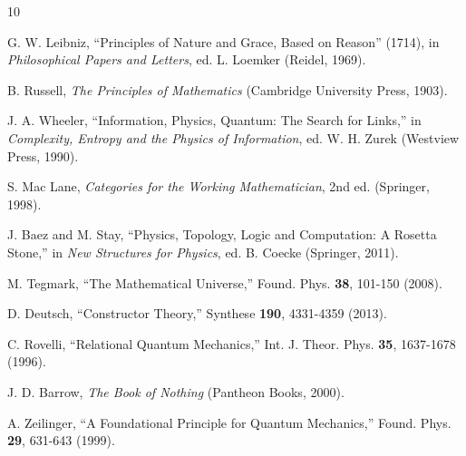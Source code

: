 \documentclass[12pt,a4paper]{article}
\begin{document}
\begin{thebibliography}{10}

G. W. Leibniz, ``Principles of Nature and Grace, Based on Reason'' (1714), in \textit{Philosophical Papers and Letters}, ed. L. Loemker (Reidel, 1969).

B. Russell, \textit{The Principles of Mathematics} (Cambridge University Press, 1903).

J. A. Wheeler, ``Information, Physics, Quantum: The Search for Links,'' in \textit{Complexity, Entropy and the Physics of Information}, ed. W. H. Zurek (Westview Press, 1990).

S. Mac Lane, \textit{Categories for the Working Mathematician}, 2nd ed. (Springer, 1998).

J. Baez and M. Stay, ``Physics, Topology, Logic and Computation: A Rosetta Stone,'' in \textit{New Structures for Physics}, ed. B. Coecke (Springer, 2011).

M. Tegmark, ``The Mathematical Universe,'' Found. Phys. \textbf{38}, 101-150 (2008).

D. Deutsch, ``Constructor Theory,'' Synthese \textbf{190}, 4331-4359 (2013).

C. Rovelli, ``Relational Quantum Mechanics,'' Int. J. Theor. Phys. \textbf{35}, 1637-1678 (1996).

J. D. Barrow, \textit{The Book of Nothing} (Pantheon Books, 2000).

A. Zeilinger, ``A Foundational Principle for Quantum Mechanics,'' Found. Phys. \textbf{29}, 631-643 (1999).

\end{thebibliography}
\end{document}
